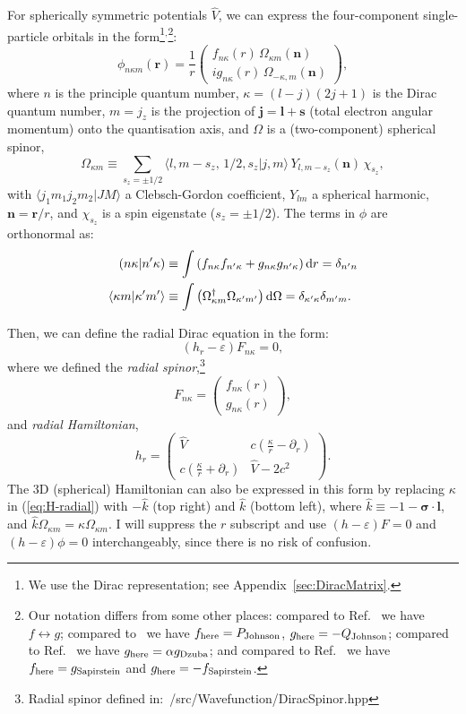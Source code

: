 \documentclass[10pt,twocolumn,a4paper]{article}%
\newcommand{\braket}[1]{\ensuremath{\langle #1\rangle}}	%
\newcommand{\matr}[4]{\ensuremath{\begin{pmatrix}#1&#2\\#3&#4\end{pmatrix}}}	%
\newcommand{\twocomp}[2]{\ensuremath{\begin{pmatrix}#1\\#2\end{pmatrix}}}	%
\renewcommand{\v}[1]{\ensuremath{\boldsymbol{#1}}}		%
\newcommand{\be}{\begin{equation}}
\newcommand{\ee}{\end{equation}}
\def\d{\ensuremath{{\rm d}}}
\def\en{\ensuremath{\varepsilon}}
\def\p{\ensuremath{\partial}}
\newcommand{\s}{\ensuremath{\sigma}}
\renewcommand{\k}{\ensuremath{\kappa}}
\begin{document}
For spherically symmetric potentials $\hat V$, we can express the four-component single-particle orbitals in the form\footnote{We use the Dirac representation; see Appendix~\ref{sec:DiracMatrix}.}$^,$\footnote{Our notation differs from some other places: compared to Ref.~\cite{BetheBook} we have $f\leftrightarrow g$;
compared to~\cite{JohnsonBook2007} we have $f_{\rm here}= P_{\rm Johnson}$, $g_{\rm here}= -Q_{\rm Johnson}$; compared to Ref.~\cite{Dzuba1982a} we have $g_{\rm here} = \alpha g_{\rm Dzuba}$; and compared to Ref.~\cite{Sapirstein1998} we have $f_{\rm here} = g_{\rm Sapirstein}$ and $g_{\rm here}=-f_{\rm Sapirstein}$.}:
\be\label{eq:phi-orbital}
\phi_{n\k m}(\v{r}) = \frac{1}{r}\twocomp
{f_{n\k}(r)\,\Omega_{\k m}(\v{n})}
{ig_{n\k}(r)\,\Omega_{-\k ,m}(\v{n})},
\ee
where $n$ is the principle quantum number, $\k = (l-j)(2j+1)$ is the Dirac quantum number, $m=j_z$ is the projection of $\v{j}=\v{l}+\v{s}$ (total electron angular momentum) onto the quantisation axis,
and $\Omega$ is a (two-component) spherical spinor,
\be
\Omega_{\k m} \equiv \sum_{s_z=\pm1/2} \braket{l,m-s_z ,\,1/2,s_z|j,m}\,Y_{l,m-s_z}(\v{n})\,\chi_{s_z},
\ee
with $\braket{j_1 m_1 j_2 m_2|JM}$ a Clebsch-Gordon coefficient, $Y_{lm}$ a spherical harmonic, $\v{n} = \v{r}/r$, and $\chi_{s_z}$ is a spin eigenstate
($s_z=\pm1/2$).
The terms in $\phi$ are orthonormal as:
\begin{align}\label{eq:ffrad}
\left(n\k|n'\k\right)&\equiv\int\left(f_{n\k}f_{n'\k}+g_{n\k}g_{n'\k}\right)\d r = \delta_{n'n}\\
\braket{\k m|\k'm'}&\equiv\int\left(\Omega_{\k m}^\dag\Omega_{\k' m'}\right)\d \Omega = \delta_{\k'\k}\delta_{m'm}.
\end{align}


Then, we can define the radial Dirac equation in the form:
\be\label{eq:Dirac-radial}
\left(h_r - \en\right)F_{n\k} = 0,
\ee
where we defined the {\em radial spinor},\footnote{Radial spinor defined in:~/src/Wavefunction/DiracSpinor.hpp}
\be\label{eq:F-radial}
F_{n\k} =\twocomp {f_{n\k}(r)}{g_{n\k}(r)},
\ee
and {\em radial Hamiltonian},
\be\label{eq:H-radial}
h_r = \matr 	{\hat V} 				{c(\frac{\k}{r}-\p_r )}
			{c(\frac{\k}{r} + \p_r  )}	{\hat V-2c^2}.
\ee
The 3D (spherical) Hamiltonian can also be expressed in this form by replacing $\k$ in (\ref{eq:H-radial}) with $-\hat k$ (top right) and $\hat k$ (bottom left), where $\hat k \equiv -1 - \v{\s}\cdot\v{l}$,  and $\hat k\Omega_{\k m} = \k\Omega_{\k m}$.
I will suppress the $r$ subscript and use
$\left(h - \en\right)F = 0$ and $\left(h - \en\right)\phi = 0$ interchangeably, since there is no risk of confusion.\\
\end{document}
